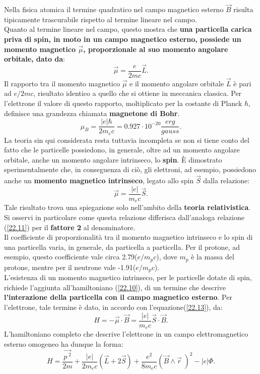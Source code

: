 \documentclass[a4paper,12pt,oneside]{book}
\begin{document}
Nella fisica atomica il termine quadratico nel campo magnetico esterno $\vec{B}$ risulta tipicamente trascurabile rispetto al termine lineare nel campo.\\
Quanto al termine lineare nel campo, questo mostra che \textbf{una particella carica priva di spin, in moto in un campo magnetico esterno, possiede un momento magnetico $\vec{\mu}$, proporzionale al suo momento angolare orbitale, dato da}:
\begin{equation}
\vec{\mu}=\frac{e}{2mc}\vec{L} .
\label{22.11}
\end{equation} 
Il rapporto tra il momento magnetico $\vec{\mu}$ e il momento angolare orbitale $\vec{L}$ è pari ad $e/2mc$, risultato identico a quello che si ottiene in meccanica classica. Per l'elettrone il valore di questo rapporto, moltiplicato per la costante di Planck $\hbar$, definisce una grandezza chiamata \textbf{magnetone di Bohr}.
\begin{equation}
\mu_{B}=\frac{|e|\hbar}{2m_{e}c}=0.927\cdot10^{-20}\frac{erg}{gauss} .
\end{equation}
La teoria sin qui considerata resta tuttavia incompleta se non si tiene conto del fatto che le particelle possiedono, in generale, oltre ad un momento angolare orbitale, anche un momento angolare intrinseco, lo \textbf{spin}. È dimostrato sperimentalmente che, in conseguenza di ciò, gli elettroni, ad esempio, possiedono anche un \textbf{momento magnetico intrinseco}, legato allo spin $\vec{S}$ dalla relazione:
\begin{equation}
\vec{\mu}=\frac{|e|}{m_{e}c}\vec{S} .
\label{22.13}
\end{equation}
Tale risultato trova una spiegazione solo nell'ambito della \textbf{teoria relativistica}. Si osservi in particolare come questa relazione differisca dall'analoga relazione (\ref{22.11}) per il \textbf{fattore 2} al denominatore.\\
Il coefficiente di proporzionalità tra il momento magnetico intrinseco e lo spin di una particella varia, in generale, da particella a particella. Per il protone, ad esempio, questo coefficiente vale circa 2.79($e/m_{p}c$), dove $m_{p}$ è la massa del protone, mentre per il neutrone vale -1.91($e/m_{p}c$).\\
L'esistenza di un momento magnetico intrinseco, per le particelle dotate di spin, richiede l'aggiunta all'hamiltoniano (\ref{22.10}), di un termine che descrive \textbf{l'interazione della particella con il campo magnetico esterno}. Per l'elettrone, tale termine è dato, in accordo con l'equazione(\ref{22.13}), da:
\begin{equation}
H=-\vec{\mu}\cdot\vec{B}=\frac{|e|}{m_{e}c}\vec{S}\cdot\vec{B} .
\end{equation}
L'hamiltoniano completo che descrive l'elettrone in un campo elettromagnetico esterno omogeneo ha dunque la forma:
\begin{equation}
H=\frac{\vec{p^{\;2}}}{2m}+\frac{|e|}{2m_{e}c}(\vec{L}+2\vec{S})+\frac{e^{2}}{8m_{e}c}(\vec{B}\wedge\vec{r}\;)^{2}-|e|\Phi .
\end{equation}
\end{document}
